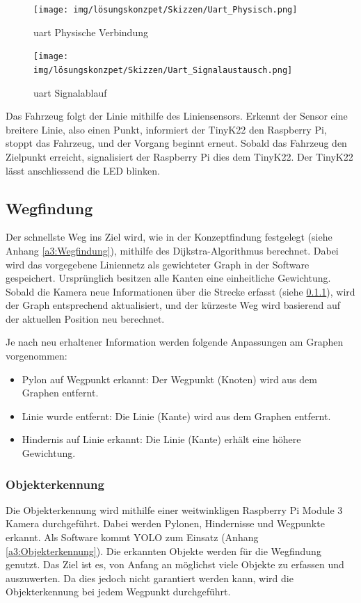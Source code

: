 \documentclass[../main.tex]{subfiles}
\begin{document}
\begin{figure}[H]
\centering
\texttt{[image: img/lösungskonzpet/Skizzen/Uart\_Physisch.png]}
\caption{\Gls{uart} Physische Verbindung}
\label{img:UART_Physisch}
\end{figure}

\begin{figure}[H]
\centering
\texttt{[image: img/lösungskonzpet/Skizzen/Uart\_Signalaustausch.png]}
\caption{\Gls{uart} Signalablauf}
\label{img:UART_Signalablauf}
\end{figure}


Das Fahrzeug folgt der Linie mithilfe des Liniensensors. Erkennt der Sensor eine breitere Linie, also einen Punkt, informiert der TinyK22 den Raspberry Pi, stoppt das Fahrzeug, und der Vorgang beginnt erneut. Sobald das Fahrzeug den Zielpunkt erreicht, signalisiert der Raspberry Pi dies dem TinyK22. Der TinyK22 lässt anschliessend die LED blinken.

\newpage

\subsection{Wegfindung}

Der schnellste Weg ins Ziel wird, wie in der Konzeptfindung festgelegt (siehe Anhang \ref{a3:Wegfindung}), mithilfe des Dijkstra-Algorithmus berechnet. Dabei wird das vorgegebene Liniennetz als gewichteter Graph in der Software gespeichert. Ursprünglich besitzen alle Kanten eine einheitliche Gewichtung. Sobald die Kamera neue Informationen über die Strecke erfasst (siehe \ref{sub:Objekterkennung}), wird der Graph entsprechend aktualisiert, und der kürzeste Weg wird basierend auf der aktuellen Position neu berechnet.

Je nach neu erhaltener Information werden folgende Anpassungen am Graphen vorgenommen: \begin{itemize} 
  \item Pylon auf Wegpunkt erkannt: Der Wegpunkt (Knoten) wird aus dem Graphen entfernt.
  \item Linie wurde entfernt: Die Linie (Kante) wird aus dem Graphen entfernt. 
  \item Hindernis auf Linie erkannt: Die Linie (Kante) erhält eine höhere Gewichtung.
\end{itemize}

\subsubsection{Objekterkennung} \label{sub:Objekterkennung}
Die Objekterkennung wird mithilfe einer weitwinkligen Raspberry Pi Module 3 Kamera durchgeführt. Dabei werden Pylonen, Hindernisse und Wegpunkte erkannt. Als Software kommt YOLO zum Einsatz (Anhang \ref{a3:Objekterkennung}). Die erkannten Objekte werden für die Wegfindung genutzt. Das Ziel ist es, von Anfang an möglichst viele Objekte zu erfassen und auszuwerten. Da dies jedoch nicht garantiert werden kann, wird die Objekterkennung bei jedem Wegpunkt durchgeführt. 
\end{document}
